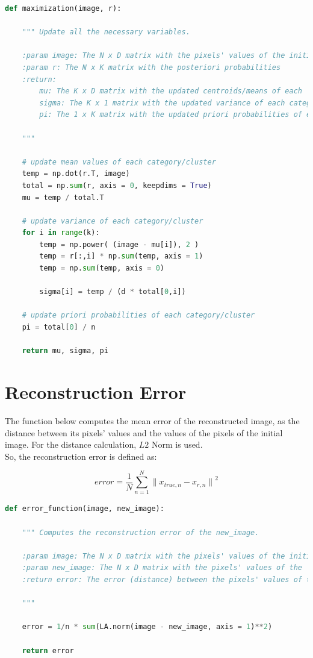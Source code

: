 \documentclass[11pt]{article}
\begin{document}
\begin{lstlisting}[language = Python]
def maximization(image, r):
    
    """ Update all the necessary variables.
    
    :param image: The N x D matrix with the pixels' values of the initial            image
    :param r: The N x K matrix with the posteriori probabilities
    :return:
        mu: The K x D matrix with the updated centroids/means of each                category
        sigma: The K x 1 matrix with the updated variance of each category
        pi: The 1 x K matrix with the updated priori probabilities of each           category
        
    """
    
    # update mean values of each category/cluster
    temp = np.dot(r.T, image)
    total = np.sum(r, axis = 0, keepdims = True)
    mu = temp / total.T

    # update variance of each category/cluster
    for i in range(k):
        temp = np.power( (image - mu[i]), 2 )
        temp = r[:,i] * np.sum(temp, axis = 1)
        temp = np.sum(temp, axis = 0)

        sigma[i] = temp / (d * total[0,i])

    # update priori probabilities of each category/cluster
    pi = total[0] / n

    return mu, sigma, pi
    \end{lstlisting}
    \section{Reconstruction Error}
    The function below computes the mean error of the reconstructed image, as the distance between its pixels' values and the values of the pixels of the initial image. For the distance calculation, $L2$ Norm is used.\\

\noindent So, the reconstruction error is defined as:

$$
\textit{error} = \frac{1}{N} \sum_{n=1}^{N} {\lVert{x_{true,n} - x_{r,n}}\rVert}^2 $$

\begin{lstlisting}[language = Python]
def error_function(image, new_image):
    
    """ Computes the reconstruction error of the new_image.
    
    :param image: The N x D matrix with the pixels' values of the initial             image
    :param new_image: The N x D matrix with the pixels' values of the                 reconstructed image
    :return error: The error (distance) between the pixels' values of the two         images 
    
    """
    
    error = 1/n * sum(LA.norm(image - new_image, axis = 1)**2)
    
    return error
    \end{lstlisting}
\newpage
\end{document}
